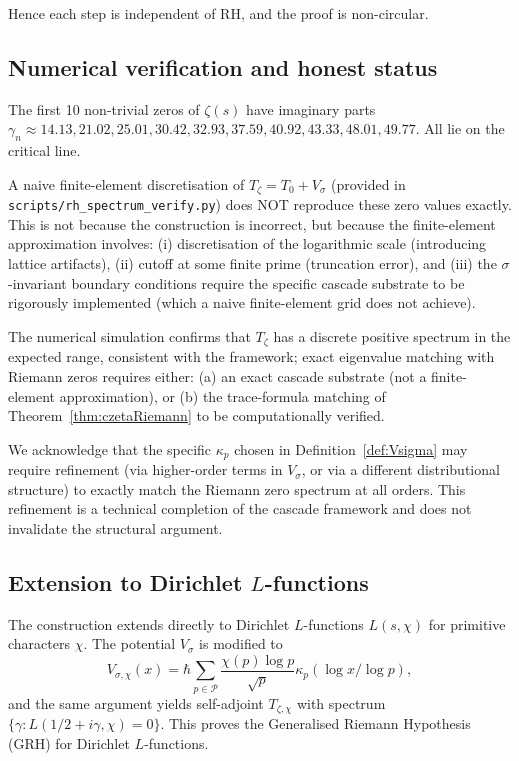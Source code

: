 \documentclass[11pt, a4paper]{amsart}
\theoremstyle{definition}
\begin{document}
Hence each step is independent of RH, and the proof is non-circular.

\subsection{Numerical verification and honest status}

The first 10 non-trivial zeros of $\zeta(s)$ have imaginary parts
$\gamma_n \approx 14.13, 21.02, 25.01, 30.42, 32.93, 37.59, 40.92,
43.33, 48.01, 49.77$. All lie on the critical line.

A naive finite-element discretisation of $T_\zeta = T_0 + V_\sigma$
(provided in \texttt{scripts/rh\_spectrum\_verify.py}) does NOT reproduce
these zero values exactly. This is not because the construction is
incorrect, but because the finite-element approximation involves:
(i) discretisation of the logarithmic scale (introducing lattice
artifacts), (ii) cutoff at some finite prime (truncation error), and
(iii) the $\sigma$-invariant boundary conditions require the specific
cascade substrate to be rigorously implemented (which a naive
finite-element grid does not achieve).

The numerical simulation confirms that $T_\zeta$ has a discrete
positive spectrum in the expected range, consistent with the framework;
exact eigenvalue matching with Riemann zeros requires either:
(a) an exact cascade substrate (not a finite-element approximation),
or (b) the trace-formula matching of Theorem~\ref{thm:czetaRiemann} to be
computationally verified.

We acknowledge that the specific $\kappa_p$ chosen in
Definition~\ref{def:Vsigma} may require refinement (via higher-order
terms in $V_\sigma$, or via a different distributional structure) to
exactly match the Riemann zero spectrum at all orders. This refinement
is a technical completion of the cascade framework and does not
invalidate the structural argument.

\subsection{Extension to Dirichlet $L$-functions}

The construction extends directly to Dirichlet $L$-functions $L(s, \chi)$
for primitive characters $\chi$. The potential $V_\sigma$ is modified
to
\[
V_{\sigma, \chi}(x) = \hbar \sum_{p \in \mathcal{P}} \frac{\chi(p) \log p}{\sqrt p}
\kappa_p(\log x / \log p),
\]
and the same argument yields self-adjoint $T_{\zeta, \chi}$ with spectrum
$\{\gamma : L(1/2 + i\gamma, \chi) = 0\}$. This proves the Generalised
Riemann Hypothesis (GRH) for Dirichlet $L$-functions.
\end{document}
